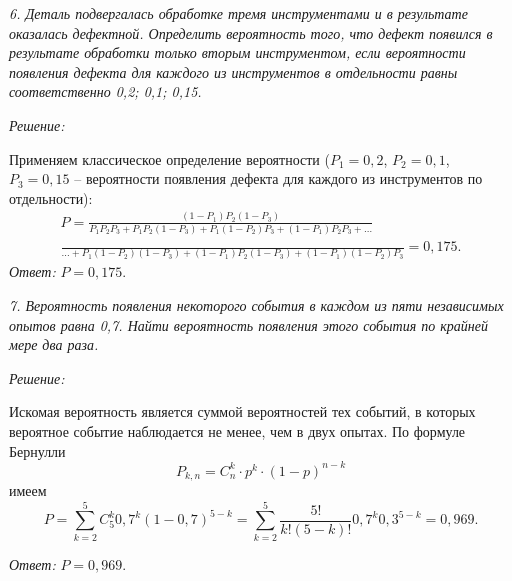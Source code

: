 \vspace*{2em}

\emph{6. Деталь подвергалась обработке тремя инструментами и в результате оказалась
дефектной. Определить вероятность того, что дефект появился в результате
обработки только вторым инструментом, если вероятности появления дефекта для
каждого из инструментов в отдельности равны соответственно 0,2; 0,1; 0,15.}

\vspace*{2em}
\emph{Решение:}
    
Применяем классическое определение вероятности (\( P_1 = 0,2 \), \( P_2 = 0,1
\), \( P_3 = 0,15 \) -- вероятности появления дефекта для каждого из
инструментов по отдельности):
\begin{align*}
    P = \frac{(1-P_1)P_2(1-P_3)}{P_1P_2P_3 + P_1P_2(1-P_3) + P_1(1-P_2)P_3 +
    (1-P_1)P_2P_3 + \ldots}\\
    \frac{}{\ldots + P_1(1-P_2)(1-P_3) + (1-P_1)P_2(1-P_3) + (1-P_1)(1-P_2)P_3} = 0,175.
\end{align*}
\vspace*{2em}
\emph{Ответ:} \( P = 0,175 \).

\pagebreak

\emph{7. Вероятность появления некоторого события в каждом из пяти независимых опытов
равна 0,7. Найти вероятность появления этого события по крайней мере два раза.}

\vspace*{2em}
\emph{Решение:}

Искомая вероятность является суммой вероятностей тех событий, в которых
вероятное событие наблюдается не менее, чем в двух опытах. По формуле Бернулли
\[
    P_{k,n}=C_n^k\cdot p^k \cdot (1 - p)^{n-k}
\]
имеем
\[
    P = \sum_{k=2}^5 C_5^k 0,7^k (1-0,7)^{5-k} = \sum_{k=2}^5 \frac{5!}{k!(5-k)!}
    0,7^k 0,3^{5-k} = 0,969.
\]

\vspace*{2em}
\emph{Ответ:} \( P = 0,969 \).
